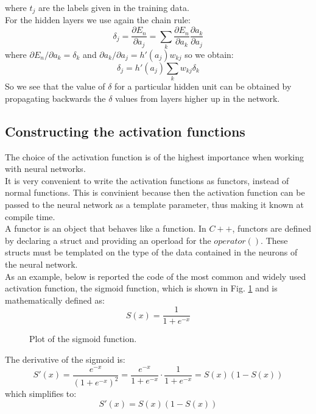 \documentclass[12pt]{article}
\begin{document}
where $t_j$ are the labels given in the training data. \\
For the hidden layers we use again the chain rule:
\begin{equation}
  \delta_j = \frac{\partial E_n}{\partial a_j}
  = \sum_k \frac{\partial E_n}{\partial a_k}\frac{\partial a_k}{\partial a_j}
  \label{hidden_layers_delta}
\end{equation}
where $\partial E_n / \partial a_k = \delta_k$ and $\partial a_k / \partial a_j = h'(a_j)w_{kj}$
so we obtain:
\begin{equation}
  \delta_j = h'(a_j)\sum_k w_{kj}\delta_k
  \label{simplified_hidden_layer_delta}
\end{equation}
So we see that the value of $\delta$ for a particular hidden unit can be obtained by propagating backwards 
the $\delta$ values from layers higher up in the network.

\subsection{Constructing the activation functions}
The choice of the activation function is of the highest importance when working with neural networks. \\
It is very convenient to write the activation functions as functors, instead of normal functions. This is
convinient because then the activation function can be passed to the neural network as a template parameter,
thus making it known at compile time. \\
A functor is an object that behaves like a function. In $C++$, functors are defined by declaring a struct 
and providing an operload for the $operator()$. These structs must be templated on the type of the data
contained in the neurons of the neural network. \\
As an example, below is reported the code of the most common and widely used activation function, the sigmoid
function, which is shown in Fig. \ref{sigmoid} and is mathematically defined as:
\begin{equation}
  S(x) = \frac{1}{1 + e^{-x}}
\end{equation}
\begin{figure}[H]
  \centering
  \label{sigmoid}
  \caption{Plot of the sigmoid function.}
\end{figure}
The derivative of the sigmoid is:
$$
  S'(x) = \frac{e^{-x}}{(1 + e^{-x})^2} = \frac{e^{-x}}{1 + e^{-x}}\cdot\frac{1}{1 + e^{-x}} 
  = S(x)\left(1 - S(x)\right)
$$
which simplifies to:
\begin{equation}
  S'(x) = S(x)\left(1 - S(x)\right)
\end{equation}
\end{document}
